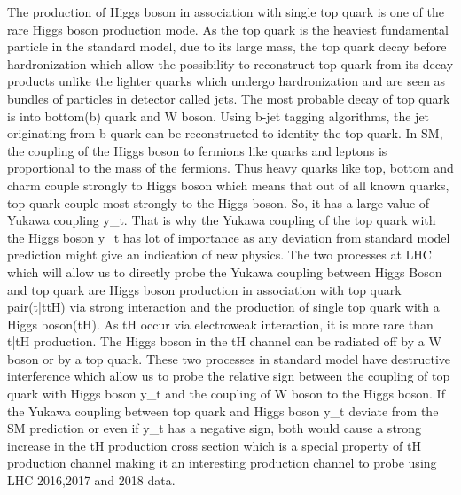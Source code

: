 \documentclass[final,3p]{CSP}
\begin{document}
The production of Higgs boson in association with single top quark is one of the rare Higgs boson production mode. As the top 
quark is the heaviest fundamental particle in the standard model, due to its large mass, the top quark decay before 
hardronization which allow the possibility to reconstruct top quark from its decay products unlike the lighter quarks which 
undergo hardronization and are seen as bundles of particles in detector called jets. The most probable decay of top quark is into 
bottom(b) quark and W boson. Using b-jet tagging algorithms, the jet originating from b-quark can be reconstructed to identity 
the top quark. In SM, the coupling of the Higgs boson to fermions like quarks and leptons is proportional to the mass of the 
fermions. Thus heavy quarks like top, bottom and charm couple strongly to Higgs boson which means that out of all known quarks, 
top quark couple most strongly to the Higgs boson. So, it has a large value of Yukawa coupling y_t. That is why the Yukawa 
coupling of the top quark with the Higgs boson y_t has lot of importance as any deviation from standard model prediction might 
give an indication of new physics. The two processes at LHC which will allow us to directly probe the Yukawa coupling between 
Higgs Boson and top quark are Higgs boson production in association with top quark pair(t\bar{t}tH) via strong interaction and 
the production of single top quark with a Higgs boson(tH). As tH occur via electroweak interaction, it is more rare than 
t\bar{t}H production. The Higgs boson in the tH channel can be radiated off by a W boson or by a top quark. These two processes 
in standard model have destructive interference which allow us to probe the relative sign between the coupling of top quark with 
Higgs boson y_t and the coupling of W boson to the Higgs boson. If the Yukawa coupling between top quark and Higgs boson y_t 
deviate from the SM prediction or even if y_t has a negative sign, both would cause a strong increase in the tH production cross 
section which is a special property of tH production channel making it an interesting production channel to probe using LHC 
2016,2017 and 2018 data.  
\end{document}
